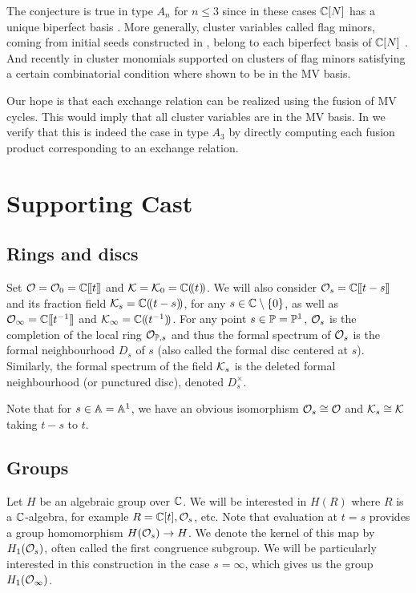 \documentclass{article}
\begin{document}
The conjecture is true in type \(A_n\) for \(n\leq 3\) since in these cases \(\CC[N]\) has a unique biperfect basis \cite[Section 2.3]{baumann2019mirkovic}.
% 
More generally, cluster variables called flag minors, coming from initial seeds constructed in \cite[Definitions~2.2--2.3]{berenstein2005cluster3}, belong to each biperfect basis of \(\CC[N]\) \cite[Remark~2.10]{baumann2019mirkovic}. 
And recently in \cite[Proposition 7.2]{baumann2020bases} cluster monomials supported on clusters of flag minors satisfying a certain combinatorial condition where shown to be in the MV basis. 

Our hope is that each exchange relation can be realized using the fusion of MV cycles. This would imply that all cluster variables are in the MV basis. In  we verify that this is indeed the case in type \(A_3\) by directly computing each fusion product corresponding to an exchange relation.

\section{Supporting Cast}\label{s:players}
% 
\subsection{Rings and discs}\label{ss:rings}
% 
Set \(\cO = \cO_0 = \CC\xt\) and \(\cK = \cK_0 = \CC\xT\).
We will also consider \(\cO_s = \CC\xt[t-s]\) and its fraction field \(\cK_s=\CC\xT[t-s]\), for any \( s \in \CC\setminus\{0\} \), as well as \( \Oinf = \CC\xt[t^{-1}] \) and \(\Kinf = \CC\xT[t^{-1}]\). For any point \( s \in \PP = \PP^1\), \( \cO_s\) is the completion of the local ring \( \mathcal O_{\PP, s} \) and thus the formal spectrum of \( \cO_s\) is the formal neighbourhood \( D_s\) of \( s \) (also called the formal disc centered at \( s\)).  Similarly, the formal spectrum of the field \(\cK_s\) is the deleted formal neighbourhood (or punctured disc), denoted \( D_s^\times\).

Note that for \( s \in \AA = \AA^1\), we have an obvious isomorphism  \(\cO_s \cong \cO\) and \(\cK_s\cong\cK\) taking \( t-s \) to \( t\). 
% 

\subsection{Groups}\label{ss:groups}
% 
Let \(H \) be an algebraic group over \( \CC \).  We will be interested in \( H(R)\) where \( R \) is a \(\CC\)-algebra, for example \(R = \CC[t], \cO_s\), etc.  
% 
Note that evaluation at \( t = s\) provides a group homomorphism \( H(\cO_s) \rightarrow H\).  We denote the kernel of this map by \( H_1(\cO_s)\), often called the  first congruence subgroup.  We will be particularly interested in this construction in the case \( s = \infty\), which gives us the group \( H_1(\Oinf)\).
\end{document}
